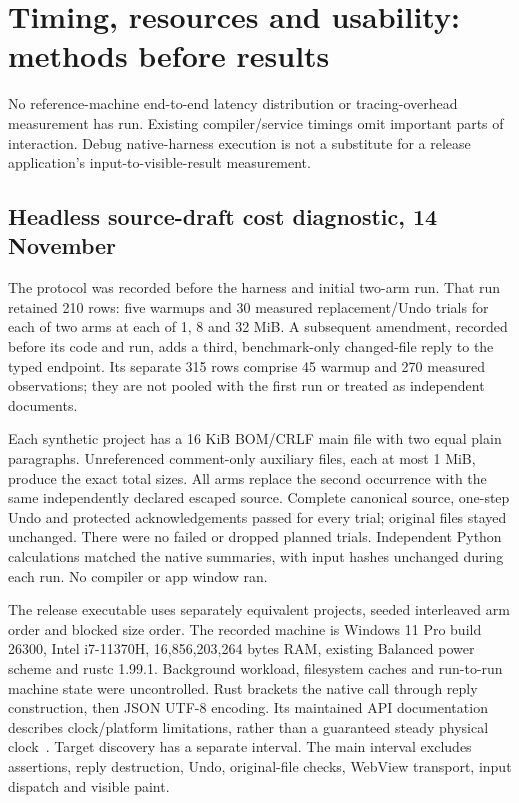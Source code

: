 \section{Timing, resources and usability: methods before results}
No reference-machine end-to-end latency distribution or tracing-overhead
measurement has run. Existing compiler/service timings omit important parts
of interaction. Debug native-harness execution is not a substitute for a
release application's input-to-visible-result measurement.



\subsection{Headless source-draft cost diagnostic, 14 November}
The protocol  was recorded before
the harness and initial two-arm run. That run retained 210 rows: five warmups
and 30 measured replacement/Undo trials for each of two arms at each of
1, 8 and 32 MiB. A subsequent amendment, recorded before its code and run,
adds a third, benchmark-only changed-file reply to the typed endpoint.
Its separate 315 rows comprise 45 warmup and 270 measured observations;
they are not pooled with the first run or treated as independent documents.

Each synthetic project has a 16 KiB BOM/CRLF main file with two equal plain
paragraphs. Unreferenced comment-only auxiliary files, each at most 1 MiB,
produce the exact total sizes. All arms replace the second occurrence with
the same independently declared escaped source. Complete canonical source,
one-step Undo and protected acknowledgements passed for every trial;
original files stayed unchanged. There were no failed or dropped planned
trials. Independent Python calculations matched the native summaries, with
input hashes unchanged during each run. No compiler or app window ran.

The release executable uses separately equivalent projects, seeded interleaved
arm order and blocked size order. The recorded machine is Windows 11 Pro
build 26300, Intel i7-11370H, 16,856,203,264 bytes RAM, existing Balanced power
scheme and rustc 1.99.1. Background workload, filesystem caches and run-to-run
machine state were uncontrolled. Rust  brackets the native call
through reply construction, then JSON UTF-8 encoding. Its maintained API
documentation describes clock/platform limitations, rather than a guaranteed
steady physical clock~\cite{rustinstant}. Target discovery has a separate
interval. The main interval excludes assertions, reply destruction, Undo,
original-file checks, WebView transport, input dispatch and visible paint.

